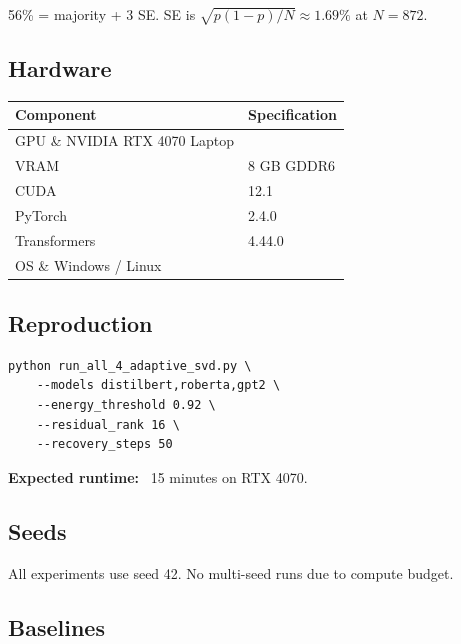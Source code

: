 56\% = majority + 3 SE. SE is $\sqrt{p(1-p)/N} \approx 1.69\%$ at $N = 872$.

\subsection{Hardware}

\begin{table}[H]
\centering
\small
\begin{tabular}{ll}
\toprule
\textbf{Component} & \textbf{Specification} \\
\midrule
GPU \& NVIDIA RTX 4070 Laptop \\
VRAM & 8 GB GDDR6 \\
CUDA & 12.1 \\
PyTorch & 2.4.0 \\
Transformers & 4.44.0 \\
OS \& Windows / Linux \\
\bottomrule
\end{tabular}
\end{table}

\subsection{Reproduction}

\begin{lstlisting}
python run_all_4_adaptive_svd.py \
    --models distilbert,roberta,gpt2 \
    --energy_threshold 0.92 \
    --residual_rank 16 \
    --recovery_steps 50
\end{lstlisting}

\textbf{Expected runtime:} ~15 minutes on RTX 4070.

\subsection{Seeds}

All experiments use seed 42. No multi-seed runs due to compute budget.

\subsection{Baselines}

